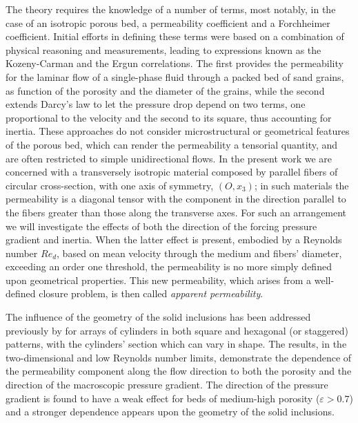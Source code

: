 The theory requires the knowledge of a number of terms, most notably, in the case of an isotropic porous bed, a permeability
coefficient and a Forchheimer coefficient. Initial efforts in defining these terms were based on a combination of physical
reasoning and measurements, leading to  expressions known as the Kozeny-Carman \cite{kozeny, carman} and the Ergun \cite{ergun}
correlations. The first provides the permeability for the laminar flow of a single-phase fluid through a packed bed of sand grains, 
as function of the porosity and the diameter of the grains, while the second extends Darcy's law to let the pressure drop depend on 
two terms, one proportional to the velocity and the second to its square, thus accounting for inertia. These approaches do not consider 
microstructural or geometrical features of the porous bed, which can render the permeability a tensorial quantity, and are often restricted 
to simple unidirectional flows.  In the present work we are concerned with a transversely isotropic material composed by parallel
fibers of circular cross-section, with one axis of symmetry, $(O,x_3)$; in such materials the permeability is a diagonal tensor
with the component in the direction parallel to the fibers greater than those along the transverse axes. For such an arrangement
we will investigate the effects of both the direction of the forcing pressure gradient and inertia. When the latter effect is present,
embodied by a Reynolds number $Re_d$, based on mean velocity through the medium and fibers' diameter, exceeding an order one threshold, 
the permeability is no more simply defined upon geometrical properties. This new permeability, which arises from a well-defined closure
problem, is then called \emph{apparent permeability}.

The influence of the geometry of the solid inclusions has been addressed previously by \citet{yazdchi2011} for arrays of cylinders 
in both square and hexagonal (or staggered) patterns, with the cylinders' section which can vary in shape. The results, in the 
two-dimensional and low Reynolds number limits, demonstrate the dependence of the  permeability component along the flow direction to both 
the porosity and the direction of the macroscopic pressure gradient. The direction of the pressure gradient is found to have a weak effect 
for beds of medium-high porosity ($\varepsilon>0.7$) and a stronger dependence appears upon the geometry of the solid inclusions. 

